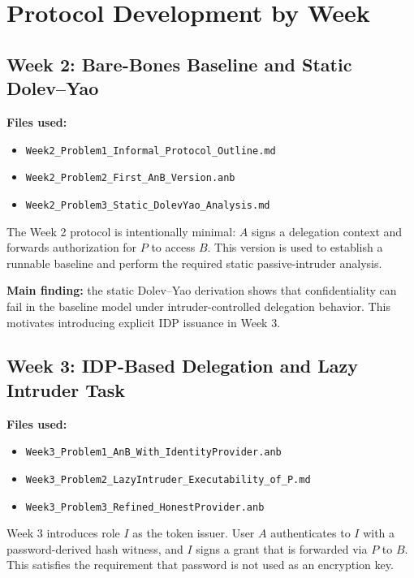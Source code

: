 \documentclass[11pt,a4paper]{article}
\begin{document}
\section{Protocol Development by Week}

\subsection{Week 2: Bare-Bones Baseline and Static Dolev--Yao}

\textbf{Files used:}
\begin{itemize}[leftmargin=1.2em]
  \item \texttt{Week2\_Problem1\_Informal\_Protocol\_Outline.md}
  \item \texttt{Week2\_Problem2\_First\_AnB\_Version.anb}
  \item \texttt{Week2\_Problem3\_Static\_DolevYao\_Analysis.md}
\end{itemize}

The Week 2 protocol is intentionally minimal:
$A$ signs a delegation context and forwards authorization for $P$ to access $B$.
This version is used to establish a runnable baseline and perform the required static passive-intruder analysis.

\textbf{Main finding:}
the static Dolev--Yao derivation shows that confidentiality can fail in the baseline model under intruder-controlled delegation behavior.
This motivates introducing explicit IDP issuance in Week 3.

\subsection{Week 3: IDP-Based Delegation and Lazy Intruder Task}

\textbf{Files used:}
\begin{itemize}[leftmargin=1.2em]
  \item \texttt{Week3\_Problem1\_AnB\_With\_IdentityProvider.anb}
  \item \texttt{Week3\_Problem2\_LazyIntruder\_Executability\_of\_P.md}
  \item \texttt{Week3\_Problem3\_Refined\_HonestProvider.anb}
\end{itemize}

Week 3 introduces role $I$ as the token issuer.
User $A$ authenticates to $I$ with a password-derived hash witness,
and $I$ signs a grant that is forwarded via $P$ to $B$.
This satisfies the requirement that password is not used as an encryption key.
\end{document}
